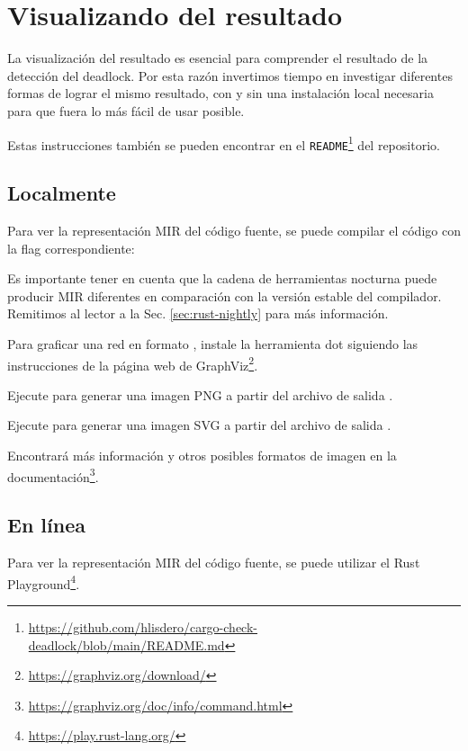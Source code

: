 \section{Visualizando del resultado}
\label{sec:visualizing-results}

La visualización del resultado es esencial para comprender el resultado de la detección del
deadlock. Por esta razón invertimos tiempo en investigar diferentes formas de lograr el mismo
resultado, con y sin una instalación local necesaria para que fuera lo más fácil de usar posible.

Estas instrucciones también se pueden encontrar en el
\texttt{README}\footnote{\url{https://github.com/hlisdero/cargo-check-deadlock/blob/main/README.md}}
del repositorio.

\subsection{Localmente}

Para ver la representación \acrshort{MIR} del código fuente, se puede compilar el código con la
flag correspondiente: 

Es importante tener en cuenta que la cadena de herramientas nocturna puede producir \acrshort{MIR}
diferentes en comparación con la versión estable del compilador. Remitimos al lector a la
Sec. \ref{sec:rust-nightly} para más información.

Para graficar una red en formato , instale la herramienta dot siguiendo las instrucciones
de la página web de GraphViz\footnote{\url{https://graphviz.org/download/}}.

Ejecute 
para generar una imagen PNG a partir del archivo de salida .

Ejecute  para generar una imagen SVG a
partir del archivo de salida .

Encontrará más información y otros posibles formatos de
imagen en la documentación\footnote{\url{https://graphviz.org/doc/info/command.html}}.

\subsection{En línea}

Para ver la representación \acrshort{MIR} del código fuente,
se puede utilizar el Rust Playground\footnote{\url{https://play.rust-lang.org/}}.


